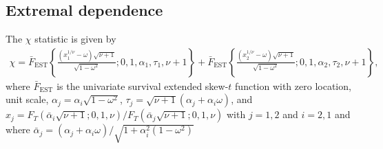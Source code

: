 \documentclass[11pt]{article}
\begin{document}
\subsection*{Extremal dependence}
The $\chi$ statistic \citep{Padoan2011} is given by
\begin{align}
  \chi = \bar{F}_{\text{EST}}\left\{ \frac{(x_1^{1 / \nu} - \omega) \sqrt{\nu + 1} }{\sqrt{1 - \omega^2}}; 0, 1, \alpha_1, \tau_1, \nu+1 \right\} + \bar{F}_{\text{EST}}\left\{ \frac{ (x_2^{1 / \nu} - \omega) \sqrt{\nu + 1} }{ \sqrt{1 - \omega^2} }; 0, 1, \alpha_2, \tau_2, \nu + 1 \right\},
\end{align}
where $\bar{F}_{\text{EST}}$ is the univariate survival extended skew-$t$ function with zero location, unit scale, $\alpha_j = \alpha_i \sqrt{1 - \omega^2}$, $\tau_j = \sqrt{\nu + 1}(\alpha_j + \alpha_i \omega)$, and $x_j = F_T(\bar{\alpha}_i \sqrt{\nu + 1}; 0, 1, \nu) / F_T(\bar{\alpha}_j \sqrt{\nu + 1}; 0, 1, \nu)$ with $j = 1, 2$ and $i = 2, 1$ and where $\bar{\alpha}_j = (\alpha_j + \alpha_i \omega) / \sqrt{ 1 + \alpha_i^2 (1 - \omega^2)}$


\end{document}
